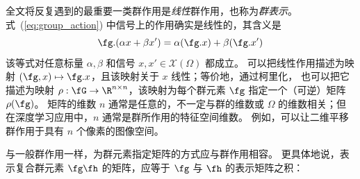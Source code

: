 全文将反复遇到的最重要一类群作用是\emph{线性}群作用，也称为{\em 群表示}。
式~(\ref{eq:group_action}) 中信号上的作用确实是线性的，其含义是
$$
\fg . (\alpha x + \beta x') = \alpha (\fg . x) + \beta (\fg . x') $$
%
该等式对任意标量 $\alpha, \beta$ 和信号 $x, x' \in \mathcal{X}(\Omega)$ 都成立。
%
可以把线性作用描述为映射 $(\fg, x) \mapsto \fg.x$，且该映射关于 $x$ 线性；等价地，通过柯里化，
也可以把它描述为映射 $\rho : \fG \rightarrow \R^{n \times n}$，该映射为每个群元素 $\fg$ 指定一个（可逆）矩阵 $\rho(\fg)$。
矩阵的维数 $n$ 通常是任意的，不一定与群的维数或 $\Omega$ 的维数相关；但在深度学习应用中，$n$ 通常是群所作用的特征空间维数。
例如，可以让二维平移群作用于具有 $n$ 个像素的图像空间。

与一般群作用一样，为群元素指定矩阵的方式应与群作用相容。
更具体地说，表示复合群元素 $\fg \fh$ 的矩阵，应等于 $\fg$ 与 $\fh$ 的表示矩阵之积：


